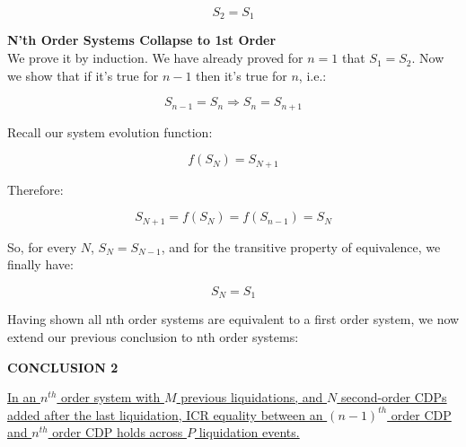\documentclass[reqno]{article}
\begin{document}
\begin{equation} 
    S_2=S_1
\end{equation}

\bigskip
\textbf{N’th Order Systems Collapse to 1st Order}\\
We prove it by induction. We have already proved for $n=1$ that $S_1=S_2$.
Now we show that if it’s true for $n-1$ then it’s true for $n$, i.e.:

\begin{equation}
    S_{n-1} = S_n \Rightarrow S_n = S_{n+1}
\end{equation}

Recall our system evolution function: 

\begin{equation} 
    f(S_N)=S_{N+1}
\end{equation}

Therefore:

\begin{equation} 
    S_{N+1} = f(S_N) = f(S_{n-1}) = S_N
\end{equation}

\bigskip
So, for every $N$, $S_N = S_{N-1}$, and for the transitive property of equivalence, we finally have:

\begin{equation}
    S_N=S_1
\end{equation}

\bigskip
Having shown all nth order systems are equivalent to a first order system, we now extend our previous conclusion to nth order systems:

\bigskip
\textbf{CONCLUSION 2}

\uline{In an $n^{th}$ order system with $M$ previous liquidations, and $N$ second-order CDPs added after the last liquidation, ICR equality between an $(n-1)^{th}$ order CDP and $n^{th}$ order CDP holds across $P$ liquidation events.}
\end{document}
